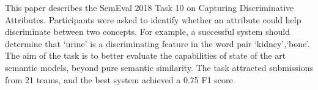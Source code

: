 This paper describes the SemEval 2018 Task 10 on Capturing Discriminative Attributes. Participants were asked to identify whether an attribute could help discriminate between two concepts. For example, a successful system should determine that `urine' is a discriminating feature in the word pair `kidney',`bone'. The aim of the task is to better evaluate the capabilities of state of the art semantic models, beyond pure semantic similarity. The task attracted submissions from 21 teams, and the best system achieved a 0.75 F1 score.
